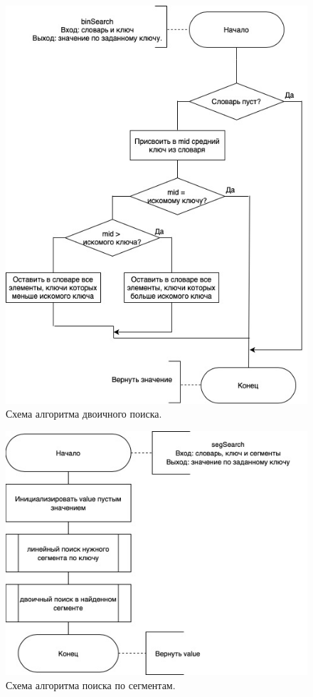 \documentclass[12pt]{report}
\begin{document}
	\begin{figure}[H]
		\centering
		\includegraphics[scale=0.55]{scheme-binSearch.jpg}
		\caption{Схема алгоритма двоичного поиска.}
		\label{fig:bs}
	\end{figure}
	
	\begin{figure}[H]
		\centering
		\includegraphics[scale=0.6]{scheme-segSearch.jpg}
		\caption{Схема алгоритма поиска по сегментам.}
		\label{fig:ss}
	\end{figure}
\end{document}
